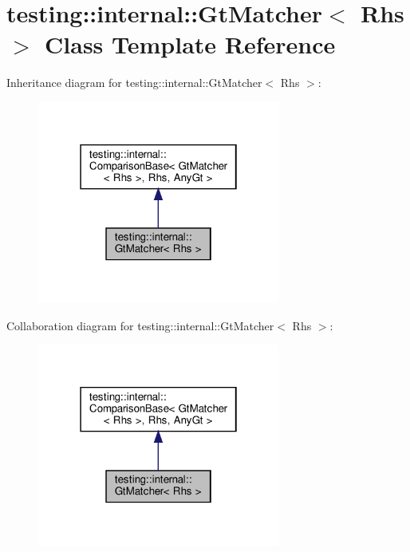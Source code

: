 \hypertarget{classtesting_1_1internal_1_1_gt_matcher}{}\section{testing\+:\+:internal\+:\+:Gt\+Matcher$<$ Rhs $>$ Class Template Reference}
\label{classtesting_1_1internal_1_1_gt_matcher}


Inheritance diagram for testing\+:\+:internal\+:\+:Gt\+Matcher$<$ Rhs $>$\+:
\nopagebreak
\begin{figure}[H]
\begin{center}
\leavevmode
\includegraphics[width=226pt]{classtesting_1_1internal_1_1_gt_matcher__inherit__graph}
\end{center}
\end{figure}


Collaboration diagram for testing\+:\+:internal\+:\+:Gt\+Matcher$<$ Rhs $>$\+:
\nopagebreak
\begin{figure}[H]
\begin{center}
\leavevmode
\includegraphics[width=226pt]{classtesting_1_1internal_1_1_gt_matcher__coll__graph}
\end{center}
\end{figure}
